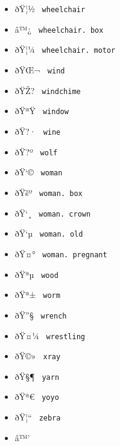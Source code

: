 \begin{itemize}
\item
  \label{symbol-wheelchair}{{ ðŸ¦½ }
  \texttt{\ wheelchair\ }}
\item
  \label{symbol-wheelchair.box}{{ â™¿ }
  \texttt{\ wheelchair.\ box\ }}
\item
  \label{symbol-wheelchair.motor}{{ ðŸ¦¼ }
  \texttt{\ wheelchair.\ motor\ }}
\item
  \label{symbol-wind}{{ ðŸŒ¬ } \texttt{\ wind\ }}
\item
  \label{symbol-windchime}{{ ðŸŽ? }
  \texttt{\ windchime\ }}
\item
  \label{symbol-window}{{ ðŸªŸ } \texttt{\ window\ }}
\item
  \label{symbol-wine}{{ ðŸ?· } \texttt{\ wine\ }}
\item
  \label{symbol-wolf}{{ ðŸ?º } \texttt{\ wolf\ }}
\item
  \label{symbol-woman}{{ ðŸ`© } \texttt{\ woman\ }}
\item
  \label{symbol-woman.box}{{ ðŸšº }
  \texttt{\ woman.\ box\ }}
\item
  \label{symbol-woman.crown}{{ ðŸ`¸ }
  \texttt{\ woman.\ crown\ }}
\item
  \label{symbol-woman.old}{{ ðŸ`µ }
  \texttt{\ woman.\ old\ }}
\item
  \label{symbol-woman.pregnant}{{ ðŸ¤° }
  \texttt{\ woman.\ pregnant\ }}
\item
  \label{symbol-wood}{{ ðŸªµ } \texttt{\ wood\ }}
\item
  \label{symbol-worm}{{ ðŸª± } \texttt{\ worm\ }}
\item
  \label{symbol-wrench}{{ ðŸ''§ } \texttt{\ wrench\ }}
\item
  \label{symbol-wrestling}{{ ðŸ¤¼ }
  \texttt{\ wrestling\ }}
\item
  \label{symbol-xray}{{ ðŸ©» } \texttt{\ xray\ }}
\item
  \label{symbol-yarn}{{ ðŸ§¶ } \texttt{\ yarn\ }}
\item
  \label{symbol-yoyo}{{ ðŸª€ } \texttt{\ yoyo\ }}
\item
  \label{symbol-zebra}{{ ðŸ¦`` } \texttt{\ zebra\ }}
\item
  \label{symbol-zodiac.aquarius}{{ â™' }
}
\end{itemize}
